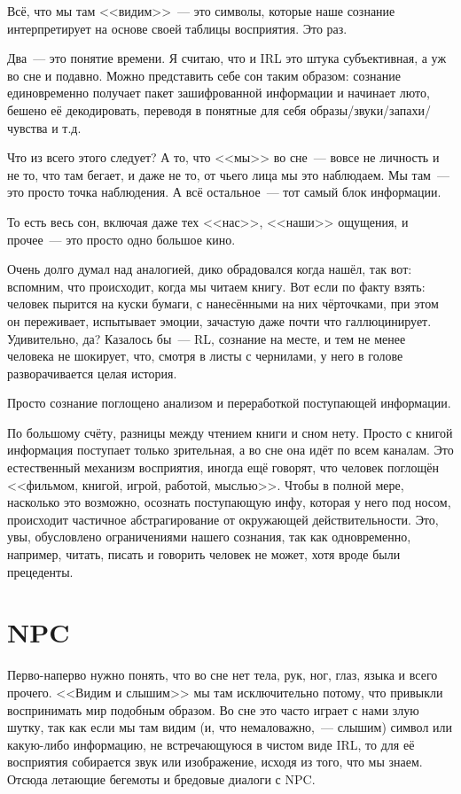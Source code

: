 \documentclass[a4paper,14pt,oneside]{memoir}
\begin{document}
Всё, что мы там <<видим>>~--- это символы, которые наше сознание интерпретирует на основе своей таблицы восприятия. Это раз. 

Два~--- это понятие времени. Я считаю, что и IRL это штука субъективная, а уж во сне и подавно. Можно представить себе сон таким образом: сознание единовременно получает пакет зашифрованной информации и начинает люто, бешено её декодировать, переводя в понятные для себя образы/звуки/запахи/чувства и т.д. 

Что из всего этого следует? А то, что <<мы>> во сне~--- вовсе не личность и не то, что там бегает, и даже не то, от чьего лица мы это наблюдаем. Мы там~--- это просто точка наблюдения. А всё остальное~--- тот самый блок информации. 

То есть весь сон, включая даже тех <<нас>>, <<наши>> ощущения, и прочее~--- это просто одно большое кино. %
  
Очень долго думал над аналогией, дико обрадовался когда нашёл, так вот: вспомним, что происходит, когда мы читаем книгу. Вот если по факту взять: человек пырится на куски бумаги, с нанесёнными на них чёрточками, при этом он переживает, испытывает эмоции, зачастую даже почти что галлюцинирует. Удивительно, да? Казалось бы~--- RL, сознание на месте, и тем не менее человека не шокирует, что, смотря в листы с чернилами, у него в голове разворачивается целая история.
 
Просто сознание поглощено анализом и переработкой поступающей информации.
 
По большому счёту, разницы между чтением книги и сном нету. Просто с книгой информация поступает только зрительная, а во сне она идёт по всем каналам. Это естественный механизм восприятия, иногда ещё говорят, что человек поглощён <<фильмом, книгой, игрой, работой, мыслью>>. Чтобы в полной мере, насколько это возможно, осознать поступающую инфу, которая у него под носом, происходит частичное абстрагирование от окружающей действительности. Это, увы, обусловлено ограничениями нашего сознания, так как одновременно, например, читать, писать и говорить человек не может, хотя вроде были прецеденты. 




\section{NPC}
Перво-наперво нужно понять, что во сне нет тела, рук, ног, глаз, языка и всего прочего. <<Видим и слышим>> мы там исключительно потому, что привыкли воспринимать мир подобным образом. Во сне это часто играет с нами злую шутку, так как если мы там видим (и, что немаловажно,~--- слышим) символ или какую-либо информацию, не встречающуюся в чистом виде IRL, то для её восприятия собирается звук или изображение, исходя из того, что мы знаем. Отсюда летающие бегемоты и бредовые диалоги с NPC. 
\end{document}
